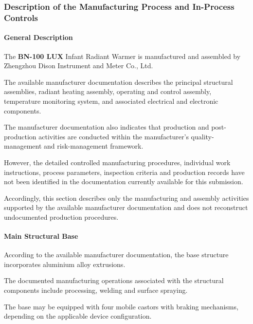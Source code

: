 ﻿%
\hypertarget{p3-2-2-2}{}

\subsubsection{Description of the Manufacturing Process and In-Process Controls}

\paragraph{General Description}

The \textbf{BN-100 LUX} Infant Radiant Warmer is manufactured and
assembled by Zhengzhou Dison Instrument and Meter Co., Ltd.

The available manufacturer documentation describes the principal
structural assemblies, radiant heating assembly, operating and
control assembly, temperature monitoring system, and associated
electrical and electronic components.

The manufacturer documentation also indicates that production and
post-production activities are conducted within the manufacturer's
quality-management and risk-management framework.

However, the detailed controlled manufacturing procedures,
individual work instructions, process parameters, inspection
criteria and production records have not been identified in the
documentation currently available for this submission.

Accordingly, this section describes only the manufacturing and
assembly activities supported by the available manufacturer
documentation and does not reconstruct undocumented production
procedures.

\paragraph{Main Structural Base}

According to the available manufacturer documentation, the base
structure incorporates aluminium alloy extrusions.

The documented manufacturing operations associated with the structural
components include processing, welding and surface spraying.

The base may be equipped with four mobile castors with braking
mechanisms, depending on the applicable device configuration.


